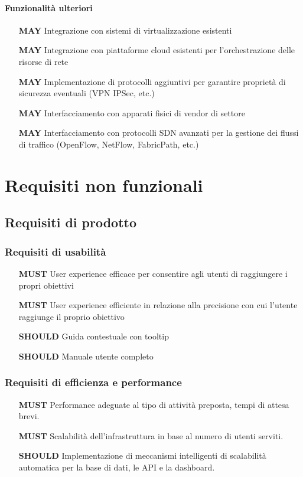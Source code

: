 \documentclass[../main.tex]{subfiles}
\begin{document}
\paragraph{Funzionalità ulteriori}
\begin{itemize}
    \item[\textbf{MAY}] Integrazione con sistemi di virtualizzazione esistenti
    \item[\textbf{MAY}] Integrazione con piattaforme cloud esistenti per l'orchestrazione delle risorse di rete
    \item[\textbf{MAY}] Implementazione di protocolli aggiuntivi per garantire proprietà di sicurezza eventuali (VPN IPSec, etc.)
    \item[\textbf{MAY}] Interfacciamento con apparati fisici di vendor di settore
    \item[\textbf{MAY}] Interfacciamento con protocolli SDN avanzati per la gestione dei flussi di traffico (OpenFlow, NetFlow, FabricPath, etc.)
\end{itemize}

\section{Requisiti non funzionali}
\subsection{Requisiti di prodotto}
\subsubsection{Requisiti di usabilità}
\begin{itemize}
    \item[\textbf{MUST}] User experience efficace per consentire agli utenti di raggiungere i propri obiettivi   
    \item[\textbf{MUST}] User experience efficiente in relazione alla precisione con cui l'utente raggiunge il proprio obiettivo
    \item[\textbf{SHOULD}] Guida contestuale con tooltip
    \item[\textbf{SHOULD}] Manuale utente completo
\end{itemize}
\subsubsection{Requisiti  di  efficienza  e  performance}       
\begin{itemize}
    \item[\textbf{MUST}] Performance adeguate al tipo di attività preposta, tempi di attesa brevi.
    \item[\textbf{MUST}] Scalabilità dell'infrastruttura in base al numero di utenti serviti.
    \item[\textbf{SHOULD}] Implementazione di meccanismi intelligenti di scalabilità automatica per la base di dati, le API e la dashboard.
\end{itemize}
\end{document}
